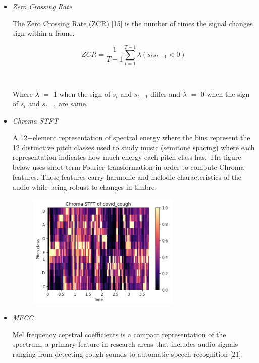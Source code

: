\documentclass[11pt]{article}
\begin{document}
\vspace{1\baselineskip}
\begin{itemize}
	\item {\large \textit{Zero Crossing Rate}}

The Zero Crossing Rate (ZCR) [15] is the number of times the signal changes sign within a frame.

\vspace{1\baselineskip}
\begin{equation}
ZCR =\frac{1}{T - 1}\sum_{t = 1}^{T - 1} \lambda\left(s_{t}s_{t - 1}<0\right)
\end{equation}


{\large \ \ \ \ }

Where \( \lambda\) $=$ 1 when the sign of \( s_{t}\) and \( s_{t - 1}\) differ and \( \lambda\) $=$ 0 when the sign of \( s_{t}\) and \( s_{t - 1}\) are same.

\vspace{1\baselineskip}
	\item {\large \textit{Chroma STFT}}

A 12$-$element representation of spectral energy where the bins represent the 12 distinctive pitch classes used to study music (semitone spacing) where each representation indicates how much energy each pitch class has. The figure below uses short term Fourier transformation in order to compute Chroma features.  These features carry harmonic and melodic characteristics of the audio while being robust to changes in timbre.

\vspace{1\baselineskip}
\begin{figure}[H]
\includegraphics[width=7.34cm,height=5.47cm]{./images/image1.png}
\end{figure}


	\item \textit{MFCC}

Mel frequency cepstral coefficients is a compact representation of the spectrum, a primary feature in research areas that includes audio signals ranging from detecting cough sounds to automatic speech recognition [21].


\end{itemize}
\end{document}
